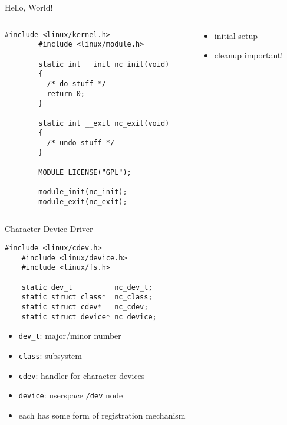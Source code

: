 \documentclass[handout]{beamer}
\begin{document}
\begin{frame}[fragile]{Hello, World!}
  \begin{columns}
    \begin{column}{0.6\textwidth}
      \begin{lstlisting}[gobble=8]
        #include <linux/kernel.h>
        #include <linux/module.h>

        static int __init nc_init(void)
        {
          /* do stuff */
          return 0;
        }

        static int __exit nc_exit(void)
        {
          /* undo stuff */
        }

        MODULE_LICENSE("GPL");

        module_init(nc_init);
        module_exit(nc_exit);

      \end{lstlisting}
    \end{column}
    \begin{column}{0.4\textwidth}
      \begin{itemize}
        \item initial setup
        \item cleanup important!
      \end{itemize}
    \end{column}
  \end{columns}
\end{frame}

\begin{frame}[fragile]{Character Device Driver}
  \begin{lstlisting}[gobble=4]
    #include <linux/cdev.h>
    #include <linux/device.h>
    #include <linux/fs.h>

    static dev_t          nc_dev_t;
    static struct class*  nc_class;
    static struct cdev*   nc_cdev;
    static struct device* nc_device;

  \end{lstlisting}

  \begin{itemize}
    \item<1-> \texttt{dev\_t}: major/minor number
    \item<2-> \texttt{class}: subsystem
    \item<3-> \texttt{cdev}: handler for character devices
    \item<4-> \texttt{device}: userspace \texttt{/dev} node
    \item<5-> each has some form of registration mechanism
  \end{itemize}
\end{frame}
\end{document}
